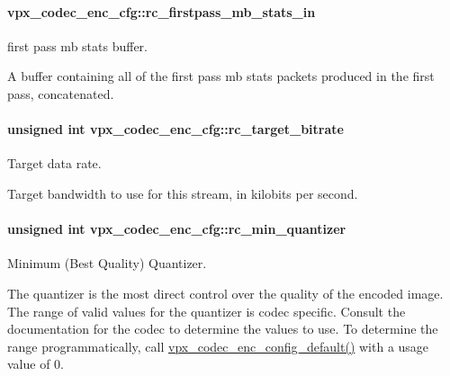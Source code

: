 \paragraph[{\texorpdfstring{rc\+\_\+firstpass\+\_\+mb\+\_\+stats\+\_\+in}{rc_firstpass_mb_stats_in}}]{ vpx\+\_\+codec\+\_\+enc\+\_\+cfg\+::rc\+\_\+firstpass\+\_\+mb\+\_\+stats\+\_\+in}\hypertarget{structvpx__codec__enc__cfg_a52dbc21bc28d6a2c7c70a43ad18461d8}{}\label{structvpx__codec__enc__cfg_a52dbc21bc28d6a2c7c70a43ad18461d8}


first pass mb stats buffer. 

A buffer containing all of the first pass mb stats packets produced in the first pass, concatenated. 
\paragraph[{\texorpdfstring{rc\+\_\+target\+\_\+bitrate}{rc_target_bitrate}}]{\setlength{\rightskip}{0pt plus 5cm}unsigned int vpx\+\_\+codec\+\_\+enc\+\_\+cfg\+::rc\+\_\+target\+\_\+bitrate}\hypertarget{structvpx__codec__enc__cfg_ab8339685175d66710f482706cc9f0aed}{}\label{structvpx__codec__enc__cfg_ab8339685175d66710f482706cc9f0aed}


Target data rate. 

Target bandwidth to use for this stream, in kilobits per second. 
\paragraph[{\texorpdfstring{rc\+\_\+min\+\_\+quantizer}{rc_min_quantizer}}]{\setlength{\rightskip}{0pt plus 5cm}unsigned int vpx\+\_\+codec\+\_\+enc\+\_\+cfg\+::rc\+\_\+min\+\_\+quantizer}\hypertarget{structvpx__codec__enc__cfg_a1324600e3c63faaa7717e85cf6509dd9}{}\label{structvpx__codec__enc__cfg_a1324600e3c63faaa7717e85cf6509dd9}


Minimum (Best Quality) Quantizer. 

The quantizer is the most direct control over the quality of the encoded image. The range of valid values for the quantizer is codec specific. Consult the documentation for the codec to determine the values to use. To determine the range programmatically, call \hyperlink{group__encoder_ga6cf8d0bbb663cd4df3a78d9eeb3bfb0e}{vpx\+\_\+codec\+\_\+enc\+\_\+config\+\_\+default()} with a usage value of 0. 
